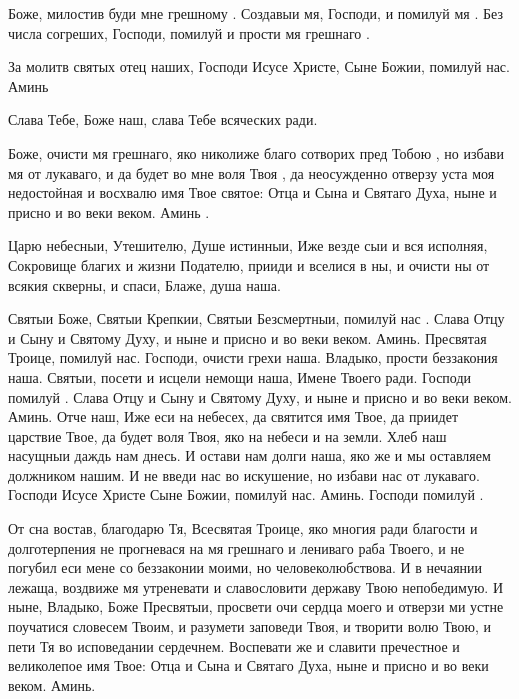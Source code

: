 \begin{mymulticols}


Боже, милостив буди мне грешному . Создавыи мя, Господи, и помилуй мя . Без числа согреших, Господи, помилуй и прости мя грешнаго . 




За молитв святых отец наших, Господи Исусе Христе, Сыне Божии, помилуй нас. Аминь 


Слава Тебе, Боже наш, слава Тебе всяческих ради. 


 Боже, очисти мя грешнаго, яко николиже благо сотворих пред Тобою , но избави мя от лукаваго, и да будет во мне воля Твоя , да неосужденно отверзу уста моя недостойная и восхвалю имя Твое святое: Отца и Сына и Святаго Духа, ныне и присно и во веки веком. Аминь .





Царю небесныи, Утешителю, Душе истинныи, Иже везде сыи и вся исполняя, Сокровище благих и жизни Подателю, прииди и вселися в ны, и очисти ны от всякия скверны, и спаси, Блаже, душа наша.


Святыи Боже, Святыи Крепкии, Святыи Безсмертныи, помилуй нас . Слава Отцу и Сыну и Святому Духу, и ныне и присно и во веки веком. Аминь. Пресвятая Троице, помилуй нас. Господи, очисти грехи наша. Владыко, прости беззакония наша. Святыи, посети и исцели немощи наша, Имене Твоего ради. Господи помилуй . Слава Отцу и Сыну и Святому Духу, и ныне и присно и во веки веком. Аминь. Отче наш, Иже еси на небесех, да святится имя Твое, да приидет царствие Твое, да будет воля Твоя, яко на небеси и на земли. Хлеб наш насущныи даждь нам днесь. И остави нам долги наша, яко же и мы оставляем должником нашим. И не введи нас во искушение, но избави нас от лукаваго. Господи Исусе Христе Сыне Божии, помилуй нас. Аминь. Господи помилуй . 




От сна востав, благодарю Тя, Всесвятая Троице, яко многия ради благости и долготерпения не прогневася на мя грешнаго и лениваго раба Твоего, и не погубил еси мене со беззаконии моими, но человеколюбствова. И в нечаянии лежаща, воздвиже мя утреневати и славословити державу Твою непобедимую. И ныне, Владыко, Боже Пресвятыи, просвети очи сердца моего и отверзи ми устне поучатися словесем Твоим, и разумети заповеди Твоя, и творити волю Твою, и пети Тя во исповедании сердечнем. Воспевати же и славити пречестное и великолепое имя Твое: Отца и Сына и Святаго Духа, ныне и присно и во веки веком. Аминь.



\end{mymulticols}
